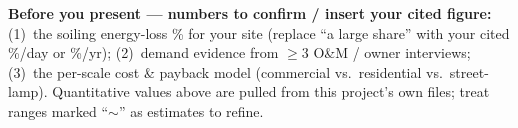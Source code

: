 \documentclass[11pt]{article}
\begin{document}
\vspace{4pt}
\noindent\colorbox{panelgrey}{\parbox{\dimexpr\linewidth-2\fboxsep}{\footnotesize
\textbf{Before you present --- numbers to confirm / insert your cited figure:}
(1)~the soiling energy-loss \% for your site (replace ``a large share'' with your cited
\%/day or \%/yr); (2)~demand evidence from $\geq$3 O\&M / owner interviews;
(3)~the per-scale cost \& payback model (commercial vs.\ residential vs.\ street-lamp).
Quantitative values above are pulled from this project's own files; treat ranges marked
``$\sim$'' as estimates to refine.}}
\end{document}
